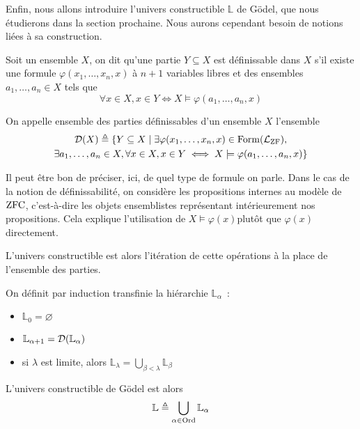 Enfin, nous allons introduire l'univers constructible $\mathbb L$ de Gödel, que
nous étudierons dans la section prochaine. Nous aurons cependant besoin de
notions liées à sa construction.

\begin{definition}
  Soit un ensemble $X$, on dit qu'une partie $Y\subseteq X$ est définissable
  dans $X$ s'il existe une formule $\varphi(x_1,\ldots,x_n,x)$ à $n+1$ variables
  libres et des ensembles $a_1,\ldots,a_n \in X$ tels que
  \[\forall x \in X, x \in Y \iff X\models \varphi(a_1,\ldots,a_n,x)\]

  On appelle ensemble des parties définissables d'un ensemble $X$ l'ensemble
  \begin{multline*}
    \mathcal{D}(X) \triangleq \{Y \subseteq X \mid \exists
    \varphi(x_1,\ldots,x_n,x)\in\operatorname{Form}(\mathcal L_{\operatorname{ZF}}),\\
    \exists a_1,\ldots,a_n \in X,
    \forall x \in X, x \in Y \iff X \models \varphi(a_1,\ldots,a_n,x)\}
  \end{multline*}
\end{definition}

\begin{remark}
  Il peut être bon de préciser, ici, de quel type de formule on parle. Dans le
  cas de la notion de définissabilité, on considère les propositions internes
  au modèle de $\operatorname{ZFC}$, c'est-à-dire les objets ensemblistes représentant
  intérieurement nos propositions. Cela explique l'utilisation de
  \og $X\models \varphi(x)$\fg plutôt que \og$\varphi(x)$\fg directement.
\end{remark}

L'univers constructible est alors l'itération de cette opérations à la place de
l'ensemble des parties.

\begin{definition}\label{def.L}
  On définit par induction transfinie la hiérarchie $\mathbb L_\alpha$~:
  \begin{itemize}
  \item $\mathbb L_0 = \varnothing$
  \item $\mathbb L_{\alpha + 1} = \mathcal{D} (\mathbb L_\alpha)$
  \item si $\lambda$ est limite, alors
    $\displaystyle\mathbb L_\lambda = \bigcup_{\beta < \lambda} \mathbb L_\beta$
  \end{itemize}
  L'univers constructible de Gödel est alors
  \[\mathbb L \triangleq \bigcup_{\alpha \in \operatorname{Ord}} \mathbb L_\alpha\]
\end{definition}

